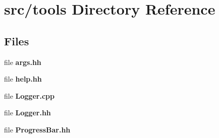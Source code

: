 \section{src/tools Directory Reference}
\label{dir_1563a38af0d3a5e4a6330d6d45e9792a}
\subsection*{Files}
\begin{DoxyCompactItemize}
\item 
file {\bf args.\-hh}
\item 
file {\bf help.\-hh}
\item 
file {\bf Logger.\-cpp}
\item 
file {\bf Logger.\-hh}
\item 
file {\bf Progress\-Bar.\-hh}
\end{DoxyCompactItemize}
